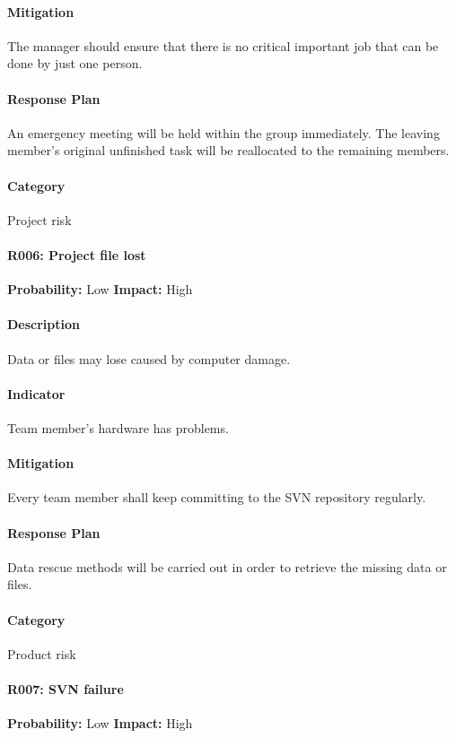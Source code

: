 \documentclass[11pt, a4paper]{report}
\begin{document}
	\paragraph{Mitigation}The manager should ensure that there is no critical important job that can be done by just one person.
	\paragraph{Response Plan}An emergency meeting will be held within the group immediately.  The leaving member's original unfinished task will be reallocated to the remaining members.\\
	\paragraph{Category} Project risk
	
	\paragraph{R006: Project file lost} \hspace{1cm} \textbf{Probability: }Low\hspace{1cm}   \textbf{Impact: }High
	\paragraph{Description}Data or files may lose caused by computer damage.
	\paragraph{Indicator}Team member's hardware has problems. 
	\paragraph{Mitigation}Every team member shall keep committing to the SVN repository regularly.
	\paragraph{Response Plan}Data rescue methods will be carried out in order to retrieve the missing data or files.\\
	\paragraph{Category} Product risk
	
	\paragraph{R007: SVN failure} \hspace{1cm} \textbf{Probability: }Low\hspace{1cm}   \textbf{Impact: }High
\end{document}
